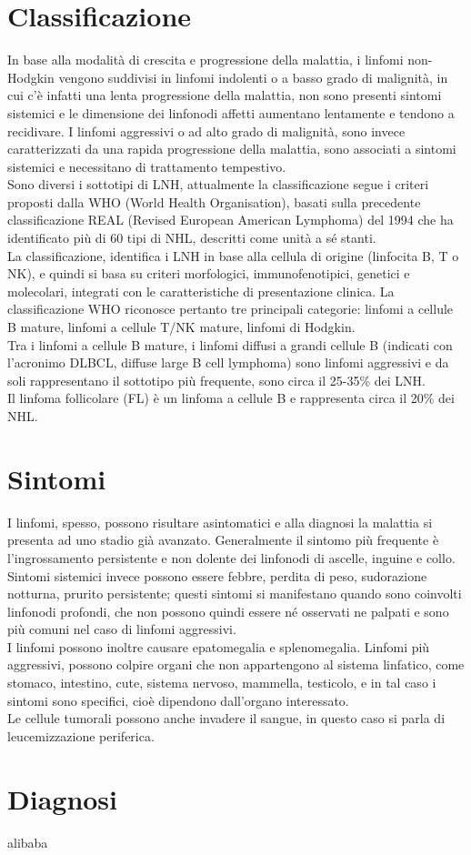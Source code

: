 \section{Classificazione}
In base alla modalità di crescita e progressione della malattia, i linfomi non-Hodgkin vengono suddivisi in 
linfomi indolenti o a basso grado di malignità, in cui c’è infatti una lenta progressione della malattia, 
non sono presenti sintomi sistemici e le dimensione dei linfonodi affetti aumentano lentamente e tendono a recidivare. 
I linfomi aggressivi o ad alto grado di malignità, sono invece caratterizzati da una rapida progressione della malattia, 
sono associati a sintomi sistemici e necessitano di trattamento tempestivo\cite{reteveneta}.\\

Sono diversi i sottotipi di LNH, attualmente la classificazione segue i criteri proposti dalla WHO 
(World Health Organisation), basati sulla precedente classificazione REAL (Revised European American Lymphoma) 
del 1994 che ha identificato più di 60 tipi di NHL, descritti come unità a sé stanti\cite{AIOM}.\\
La classificazione, identifica i LNH in base alla cellula di origine (linfocita B, T o NK), e quindi si basa su 
criteri morfologici, immunofenotipici, genetici e molecolari, integrati con le caratteristiche di presentazione clinica. 
La classificazione WHO riconosce pertanto tre principali categorie: linfomi a cellule B mature, linfomi a cellule T/NK
mature, linfomi di Hodgkin\cite{AIOM}.\\
Tra i linfomi a cellule B mature, i linfomi diffusi a grandi cellule B (indicati con l’acronimo DLBCL, 
diffuse large B cell lymphoma) sono linfomi aggressivi e da soli rappresentano il sottotipo più frequente, 
sono circa il 25-35\% dei LNH\cite{AIOM}.\\
Il linfoma follicolare (FL) è un linfoma a cellule B e rappresenta circa il 20\% dei NHL.\\

\section{Sintomi}
I linfomi, spesso, possono risultare asintomatici e alla diagnosi la malattia si presenta ad uno stadio già avanzato.
Generalmente il sintomo più frequente è l’ingrossamento persistente e non dolente dei linfonodi di ascelle, inguine e 
collo.\\ 
Sintomi sistemici invece possono essere febbre, perdita di peso, sudorazione notturna, prurito persistente; 
questi sintomi si manifestano quando sono coinvolti linfonodi profondi, che non possono quindi essere né osservati 
ne palpati e sono più comuni nel caso di linfomi aggressivi.\\ 
I linfomi possono inoltre causare epatomegalia e splenomegalia. 
Linfomi più aggressivi, possono colpire organi che non appartengono al sistema linfatico, come stomaco, intestino, 
cute, sistema nervoso, mammella, testicolo, e in tal caso i sintomi sono specifici, cioè dipendono 
dall’organo interessato.\\ 
Le cellule tumorali possono anche invadere il sangue, in questo caso si parla di leucemizzazione periferica.

\section{Diagnosi}
alibaba

